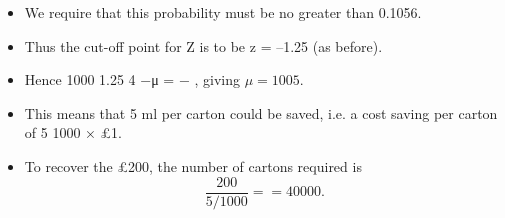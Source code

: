 \documentclass[a4paper,12pt]{article}
\begin{document}
\begin{enumerate}
\begin{itemize}
\item 
We require that this probability must be no greater
than 0.1056.
\item Thus the cut-off point for Z is to be z = –1.25 (as before).
\item Hence
1000 1.25
4
−μ = − , giving $\mu = 1005$.
\item This means that 5 ml per carton could be saved, i.e. a cost saving per carton of
5
1000
× £1. 
\item To recover the £200, the number of cartons required is 
\[ \frac{200}{5/1000} = 
= 40000.\]
\end{itemize}

\end{enumerate}
\end{document}

